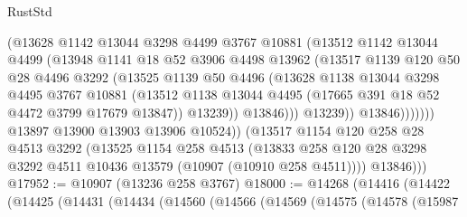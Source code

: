 \begin{lexlean}{RustStd}
\begin{coremodule}
                            (@13628
                              @1142
                              @13044
                              @3298
                              @4499
                              @3767
                              @10881
                              (@13512
                                @1142
                                @13044
                                @4499
                                (@13948
                                  @1141
                                  @18
                                  @52
                                  @3906
                                  @4498
                                  @13962
                                  (@13517
                                    @1139
                                    @120
                                    @50
                                    @28
                                    @4496
                                    @3292
                                    (@13525
                                      @1139
                                      @50
                                      @4496
                                      (@13628
                                        @1138
                                        @13044
                                        @3298
                                        @4495
                                        @3767
                                        @10881
                                        (@13512
                                          @1138
                                          @13044
                                          @4495
                                          (@17665 @391 @18 @52 @4472 @3799 @17679 @13847))
                                        @13239))
                                    @13846)))
                              @13239))
                          @13846)))))))
            @13897
            @13900
            @13903
            @13906
            @10524))
        (@13517
          @1154
          @120
          @258
          @28
          @4513
          @3292
          (@13525
            @1154
            @258
            @4513
            (@13833 @258 @120 @28 @3298 @3292 @4511 @10436 @13579 (@10907 (@10910 @258 @4511))))
          @13846)))
@17952 := @10907 (@13236 @258 @3767)
@18000 := @14268
    (@14416
      (@14422
        (@14425
          (@14431
            (@14434
              (@14560
                (@14566
                  (@14569
                    (@14575
                      (@14578
                        (@15987

\end{coremodule}
\end{lexlean}
